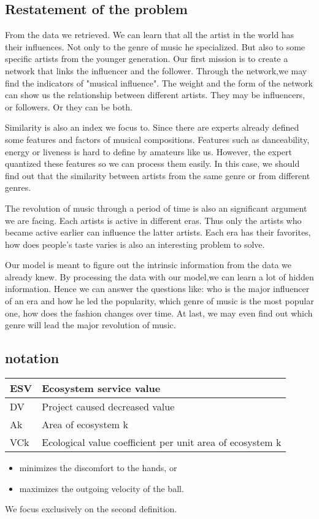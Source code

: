 \documentclass{mcmthesis}
\begin{document}
\subsection{Restatement of the problem}\quad
From the data we retrieved.\cite{1} We can learn that all the artist in the world has their influences. Not only to the genre of music he specialized. But also to some specific artists from the younger generation. Our first mission is to create a network that links the influencer and the follower. Through the network,we may find the indicators of "musical influence". The weight and the form of the network can show us the relationship between different artists. They may be influencers, or followers. Or they can be both.\par
Similarity is also an index we focus to. Since there are experts already defined some features and factors of musical compositions. Features such as danceability, energy or liveness is hard to define by amateurs like us. However, the expert quantized these features so we can process them easily. In this case, we should find out that the similarity between artists from the same genre or from different genres.\par
The revolution of music through a period of time is also an significant argument we are facing. Each artists is active in different eras. Thus only the artists who became active earlier can influence the latter artists. Each era has their favorites, how does people's taste varies is also an interesting problem to solve.\par
Our model is meant to figure out the intrinsic information from the data we already knew. By processing the data with our model,we can learn a lot of hidden information. Hence we can answer the questions like: who is the major influencer of an era and how he led the popularity, which genre of music is the most popular one, how does the fashion changes over time. At last, we may even find out which genre will lead the major revolution of music.
\subsection{notation}
\begin{table}[]
\begin{tabular}{l|l}
ESV & Ecosystem service value                                   \\ \hline
DV  & Project caused decreased value                            \\
Ak  & Area of ecosystem k                                       \\
VCk & Ecological value coefficient per unit area of ecosystem k
\end{tabular}
\end{table}
\begin{itemize}%
\item minimizes the discomfort to the hands, or
\item maximizes the outgoing velocity of the ball.
\end{itemize}
We focus exclusively on the second definition.
\end{document}
